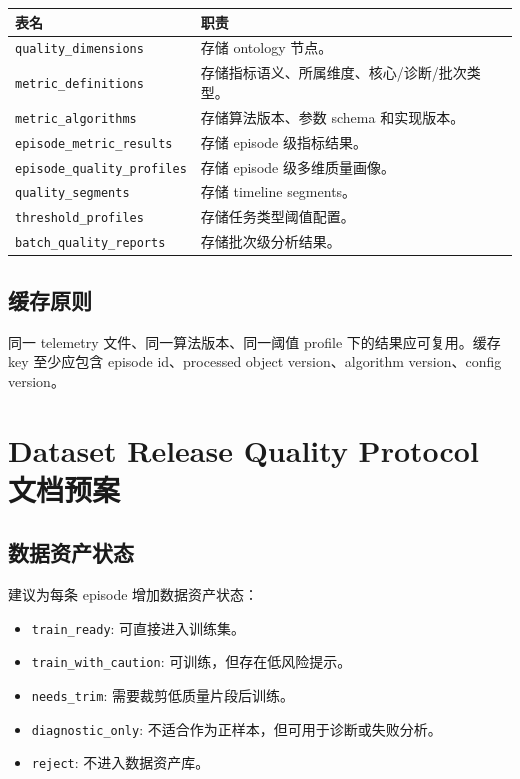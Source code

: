 \documentclass[UTF8,zihao=-4]{ctexart}
\newcommand{\Code}[1]{\texttt{#1}}
\begin{document}
\begin{longtable}{L{4cm} L{8.5cm}}
\toprule
表名 & 职责 \\
\midrule
\Code{quality\_dimensions} & 存储 ontology 节点。 \\
\Code{metric\_definitions} & 存储指标语义、所属维度、核心/诊断/批次类型。 \\
\Code{metric\_algorithms} & 存储算法版本、参数 schema 和实现版本。 \\
\Code{episode\_metric\_results} & 存储 episode 级指标结果。 \\
\Code{episode\_quality\_profiles} & 存储 episode 级多维质量画像。 \\
\Code{quality\_segments} & 存储 timeline segments。 \\
\Code{threshold\_profiles} & 存储任务类型阈值配置。 \\
\Code{batch\_quality\_reports} & 存储批次级分析结果。 \\
\bottomrule
\end{longtable}

\subsection{缓存原则}

同一 telemetry 文件、同一算法版本、同一阈值 profile 下的结果应可复用。缓存 key 至少应包含 episode id、processed object version、algorithm version、config version。

\section{Dataset Release Quality Protocol 文档预案}

\subsection{数据资产状态}

建议为每条 episode 增加数据资产状态：
\begin{itemize}
  \item \Code{train\_ready}: 可直接进入训练集。
  \item \Code{train\_with\_caution}: 可训练，但存在低风险提示。
  \item \Code{needs\_trim}: 需要裁剪低质量片段后训练。
  \item \Code{diagnostic\_only}: 不适合作为正样本，但可用于诊断或失败分析。
  \item \Code{reject}: 不进入数据资产库。
\end{itemize}
\end{document}
